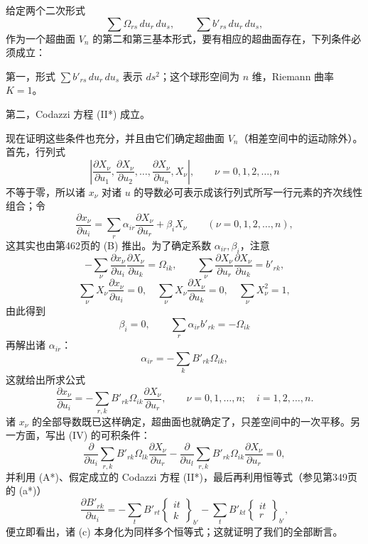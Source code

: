 给定两个二次形式
\[
\sum\Omega_{rs}\,du_r\,du_s,\qquad
\sum b'_{rs}\,du_r\,du_s,
\]
作为一个超曲面 $V_n$ 的第二和第三基本形式，要有相应的超曲面存在，下列条件必须成立：

第一，形式 $\sum b'_{rs}\,du_r\,du_s$ 表示 $ds^2$；这个球形空间为 $n$ 维，Riemann 曲率 $K=1$。

第二，Codazzi 方程 (II*) 成立。

现在证明这些条件也充分，并且由它们确定超曲面 $V_n$（相差空间中的运动除外）。首先，行列式
\[
\left|\frac{\partial X_\nu}{\partial u_1},\frac{\partial X_\nu}{\partial u_2},\ldots,
\frac{\partial X_\nu}{\partial u_n},X_\nu\right|,\qquad
\nu=0,1,2,\ldots,n
\]
不等于零，所以诸 $x_\nu$ 对诸 $u$ 的导数必可表示成该行列式所写一行元素的齐次线性组合；令
\[
\frac{\partial x_\nu}{\partial u_i}
=\sum_r\alpha_{ir}\frac{\partial X_\nu}{\partial u_r}+\beta_iX_\nu
\qquad (\nu=0,1,2,\ldots,n),
\]
这其实也由第462页的 (B) 推出。为了确定系数 $\alpha_{ir},\beta_i$，注意
\[
-\sum_\nu\frac{\partial x_\nu}{\partial u_i}\frac{\partial X_\nu}{\partial u_k}=\Omega_{ik},\qquad
\sum_\nu\frac{\partial X_\nu}{\partial u_r}\frac{\partial X_\nu}{\partial u_k}=b'_{rk},
\]
\[
\sum_\nu X_\nu\frac{\partial x_\nu}{\partial u_i}=0,\quad
\sum_\nu X_\nu\frac{\partial X_\nu}{\partial u_k}=0,\quad
\sum_\nu X_\nu^2=1,
\]
由此得到
\[
\beta_i=0,\qquad \sum_r \alpha_{ir}b'_{rk}=-\Omega_{ik}
\]
再解出诸 $\alpha_{ir}$：
\[
\alpha_{ir}=-\sum_kB'_{rk}\Omega_{ik},
\]
这就给出所求公式
\[
\tag{IV}
\frac{\partial x_\nu}{\partial u_i}
=-\sum_{r,k}B'_{rk}\Omega_{ik}\frac{\partial X_\nu}{\partial u_r},
\qquad
\nu=0,1,\ldots,n;\quad i=1,2,\ldots,n.
\]
诸 $x_\nu$ 的全部导数既已这样确定，超曲面也就确定了，只差空间中的一次平移。另一方面，写出 (IV) 的可积条件：
\[
\tag{c}
\frac{\partial}{\partial u_i}\sum_{r,k}B'_{rk}\Omega_{lk}\frac{\partial X_\nu}{\partial u_r}
-\frac{\partial}{\partial u_l}\sum_{r,k}B'_{rk}\Omega_{ik}\frac{\partial X_\nu}{\partial u_r}=0,
\]
并利用 (A*)、假定成立的 Codazzi 方程 (II*)，最后再利用恒等式（参见第349页的 (a*)）
\[
\frac{\partial B'_{rk}}{\partial u_i}
=-\sum_tB'_{rt}\left\{\begin{matrix}it\\ k\end{matrix}\right\}_{b'}
-\sum_tB'_{kt}\left\{\begin{matrix}it\\ r\end{matrix}\right\}_{b'},
\]
便立即看出，诸 (c) 本身化为同样多个恒等式；这就证明了我们的全部断言。

